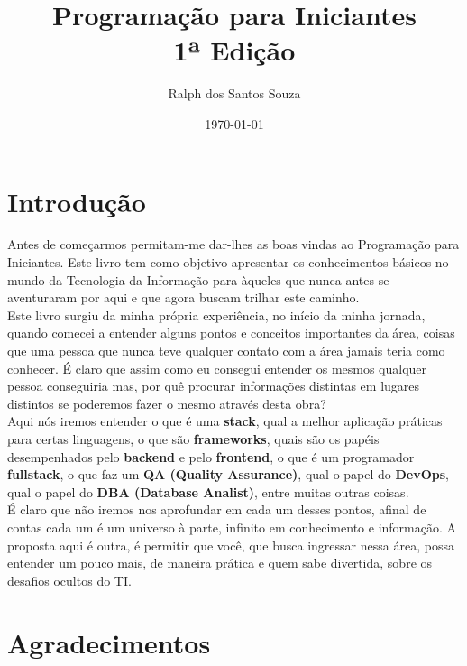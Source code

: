 \documentclass{report}
\title{Programação para Iniciantes \\ \large 1ª Edição}
\author{Ralph dos Santos Souza}
\date{\today}
\begin{document}
\maketitle

\tableofcontents

\chapter*{Introdução}
\begin{center}
    Antes de começarmos permitam-me dar-lhes as boas vindas ao Programação para Iniciantes. Este livro tem como objetivo
    apresentar os conhecimentos básicos no mundo da Tecnologia da Informação para àqueles que nunca antes se aventuraram por aqui
    e que agora buscam trilhar este caminho.\\
    \vspace{12pt}
    Este livro surgiu da minha própria experiência, no início da minha jornada, quando comecei a entender alguns pontos e conceitos
    importantes da área, coisas que uma pessoa que nunca teve qualquer contato com a área jamais teria como conhecer. 
    É claro que assim como eu consegui entender os mesmos qualquer pessoa conseguiria mas, por quê procurar informações distintas 
    em lugares distintos se poderemos fazer o mesmo através desta obra?\\
    \vspace{12pt}
    Aqui nós iremos entender o que é uma \textbf{stack}, qual a melhor aplicação práticas para certas linguagens, o que são \textbf{frameworks}, 
    quais são os papéis desempenhados pelo \textbf{backend} e pelo \textbf{frontend}, o que é um programador \textbf{fullstack}, o que faz
    um \textbf{QA (Quality Assurance)}, qual o papel do \textbf{DevOps}, qual o papel do \textbf{DBA (Database Analist)}, entre muitas outras
    coisas.\\
    \vspace{12pt}
    É claro que não iremos nos aprofundar em cada um desses pontos, afinal de contas cada um é um universo à parte, infinito em conhecimento 
    e informação. A proposta aqui é outra, é permitir que você, que busca ingressar nessa área, possa entender um pouco mais, de maneira
    prática e quem sabe divertida, sobre os desafios ocultos do TI.
\end{center}

\chapter*{Agradecimentos}
\begin{center}
    
\end{center}

\chapter{}

\chapter{}
\end{document}
